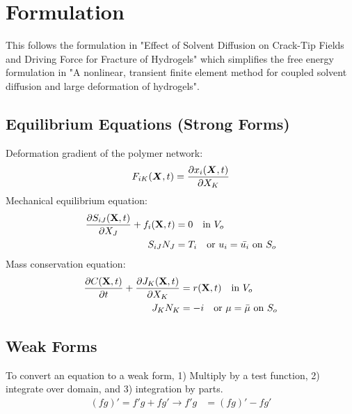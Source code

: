 \documentclass[12pt,3p]{article}
\numberwithin{equation}{section}
\begin{document}
\newpage
\section{Formulation}
This follows the formulation in "Effect of Solvent Diffusion on Crack-Tip Fields and Driving Force for Fracture of Hydrogels" which simplifies the free energy formulation in "A nonlinear, transient finite element method for coupled solvent diffusion and large deformation of hydrogels". 

\subsection{Equilibrium Equations (Strong Forms)}
Deformation gradient of the polymer network: 
\begin{equation}\label{deformation}
F_{iK}(\boldsymbol{X}, t) = \pdv{x_i(\boldsymbol{X},t)}{X_K}
\end{equation}
Mechanical equilibrium equation: 
\begin{align}\label{EqmEq}
\pdv{S_{iJ} (\mathbf{X}, t)}{X_J} + f_i (\mathbf{X}, t) &= 0 \quad \text{in } V_o \\
		S_{iJ} N_J &= T_i \quad \text{or } u_i = \bar{u_i} \text{ on } S_o
\end{align}
Mass conservation equation: 
\begin{align}\label{chemCon}
\begin{split}
\pdv{C(\mathbf{X},t)}{t} + \pdv{J_K (\mathbf{X},t)}{X_K} &= r(\mathbf{X},t) \quad \text{in } V_o \\
J_K N_K &= - i \quad \text{or } \mu = \bar{\mu} \text{ on } S_o
\end{split}
\end{align}

\subsection{Weak Forms}
To convert an equation to a weak form, 1) Multiply by a test function, 2) integrate over domain, and 3) integration by parts. 
\begin{align}\label{IntParts}
(fg)' = f'g + fg' \rightarrow f'g &= (fg)' - fg'
\end{align}
\end{document}

